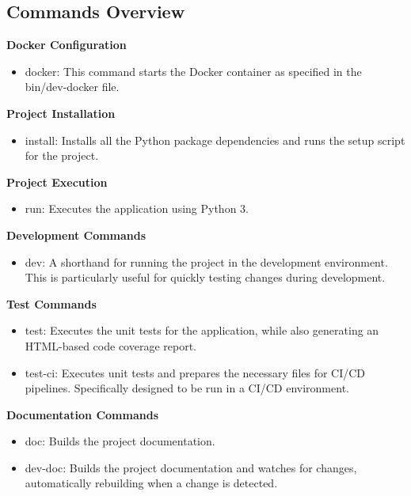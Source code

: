 \subsection{Commands Overview}\label{commands-overview}

\textbf{Docker Configuration}

\begin{itemize}
\item
  docker: This command starts the Docker container as specified in the
  bin/dev-docker file.
\end{itemize}

\textbf{Project Installation}

\begin{itemize}
\item
  install: Installs all the Python package dependencies and runs the
  setup script for the project.
\end{itemize}

\textbf{Project Execution}

\begin{itemize}
\item
  run: Executes the application using Python 3.
\end{itemize}

\textbf{Development Commands}

\begin{itemize}
\item
  dev: A shorthand for running the project in the development
  environment. This is particularly useful for quickly testing changes
  during development.
\end{itemize}

\textbf{Test Commands}

\begin{itemize}
\item
  test: Executes the unit tests for the application, while also
  generating an HTML-based code coverage report.
\item
  test-ci: Executes unit tests and prepares the necessary files for
  CI/CD pipelines. Specifically designed to be run in a CI/CD
  environment.
\end{itemize}

\textbf{Documentation Commands}

\begin{itemize}
\item
  doc: Builds the project documentation.
\item
  dev-doc: Builds the project documentation and watches for changes,
  automatically rebuilding when a change is detected.
\end{itemize}

